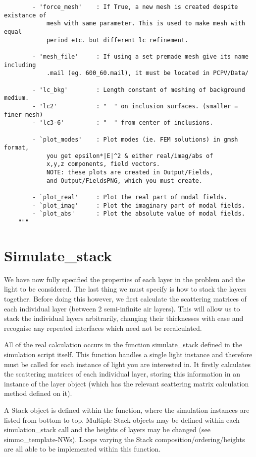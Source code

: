 \documentclass[11pt,a4paper,twoside]{report}
\begin{document}
\begin{lstlisting}
        - 'force_mesh'    : If True, a new mesh is created despite existance of 
            mesh with same parameter. This is used to make mesh with equal 
            period etc. but different lc refinement.

        - 'mesh_file'     : If using a set premade mesh give its name including 
            .mail (eg. 600_60.mail), it must be located in PCPV/Data/

        - 'lc_bkg'        : Length constant of meshing of background medium.
        - 'lc2'           : "  " on inclusion surfaces. (smaller = finer mesh)
        - 'lc3-6'         : "  " from center of inclusions.

        - `plot_modes'    : Plot modes (ie. FEM solutions) in gmsh format, 
            you get epsilon*|E|^2 & either real/imag/abs of 
            x,y,z components, field vectors.
            NOTE: these plots are created in Output/Fields, 
            and Output/FieldsPNG, which you must create.

        - `plot_real'     : Plot the real part of modal fields.
        - `plot_imag'     : Plot the imaginary part of modal fields.
        - `plot_abs'      : Plot the absolute value of modal fields.
    """
\end{lstlisting}



\section{Simulate\_stack}
\label{stack}
We have now fully specified the properties of each layer in the problem and the light to be considered. The last thing we must specify is how to stack the layers together. Before doing this however, we first calculate the scattering matrices of each individual layer (between 2 semi-infinite air layers). This will allow us to stack the individual layers arbitrarily, changing their thicknesses with ease and recognise any repeated interfaces which need not be recalculated.

All of the real calculation occurs in the function simulate\_stack defined in the simulation script itself. This function handles a single light instance and therefore must be called for each instance of light you are interested in. It firstly calculates the scattering matrices of each individual layer, storing this information in an instance of the layer object (which has the relevant scattering matrix calculation method defined on it). 

A Stack object is defined within the function, where the simulation instances are listed from bottom to top. Multiple Stack objects may be defined within each simulation\_stack call and the heights of layers may be changed (see simmo\_template-NWs). Loops varying the Stack composition/ordering/heights are all able to be implemented within this function.
\end{document}
